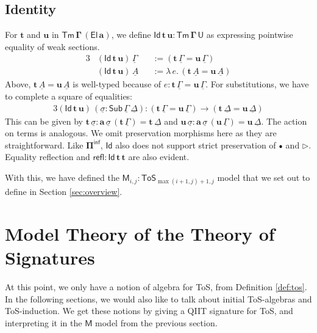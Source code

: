 \documentclass{article}
\theoremstyle{definition}
\theoremstyle{theorem}
\newcommand{\refl}{\mathsf{refl}}
\newcommand{\Sub}{\mathsf{Sub}}
\newcommand{\Tm}{\mathsf{Tm}}
\newcommand{\U}{\mathsf{U}}
\newcommand{\El}{\mathsf{El}}
\newcommand{\Id}{\mathsf{Id}}
\newcommand{\ra}{\rightarrow}
\newcommand{\ToS}{\mathsf{ToS}}
\newcommand{\ext}{\triangleright}
\newcommand{\emptycon}{\scaleobj{.75}\bullet}
\newcommand{\Piinf}{\Pi^{\mathsf{inf}}}
\newcommand{\bTm}{\boldsymbol{\Tm}}
\newcommand{\bGamma}{\boldsymbol{\Gamma}}
\newcommand{\bt}{\boldsymbol{t}}
\newcommand{\bu}{\boldsymbol{u}}
\newcommand{\ba}{\boldsymbol{a}}
\newcommand{\bU}{\boldsymbol{\U}}
\newcommand{\bEl}{\boldsymbol{\El}}
\newcommand{\bPiinf}{\boldsymbol{\Piinf}}
\newcommand{\bId}{\boldsymbol{\Id}}
\newcommand{\bM}{\boldsymbol{\mathsf{M}}}
\newcommand{\ul}[1]{\underline{#1}}
\newcommand{\ulGamma}{\ul{\Gamma}}
\newcommand{\ulDelta}{\ul{\Delta}}
\newcommand{\ulsigma}{\ul{\sigma}}
\newcommand{\ulA}{\ul{A}}
\begin{document}
\subsection{Identity}
For $\bt$ and $\bu$ in $\bTm\,\bGamma\,(\bEl\,\ba)$, we define $\bId\,\bt\,\bu
\boldsymbol{:} \bTm\,\bGamma\,\bU$ as expressing pointwise equality of weak
sections.
\begin{alignat*}{3}
& (\bId\,\bt\,\bu)\,\ulGamma &&:= (\bt\,\ulGamma = \bu\,\ulGamma)\\
& (\bId\,\bt\,\bu)\,\ulA     && := \lambda\,e.\, (\bt\,\ulA = \bu\,\ulA)
\end{alignat*}
Above, $\bt\,\ulA = \bu\,\ulA$ is well-typed because of $e :
\bt\,\ulGamma = \bu\,\ulGamma$. For substitutions, we have to complete a square
of equalities:
\begin{alignat*}{3}
  (\bId\,\bt\,\bu)\,(\ulsigma : \Sub\,\ulGamma\,\ulDelta) : (\bt\,\ulGamma = \bu\,\ulGamma) \ra
       (\bt\,\ulDelta = \bu\,\ulDelta)
\end{alignat*}
This can be given by $\bt\,\ulsigma : \ba\,\ulsigma\,(\bt\,\ulGamma) =
\bt\,\ulDelta$ and $\bu\,\ulsigma : \ba\,\ulsigma\,(\bu\,\ulGamma) =
\bu\,\ulDelta$. The action on terms is analogous. We omit preservation morphisms
here as they are straightforward. Like $\bPiinf$, $\bId$ also does not support
strict preservation of $\emptycon$ and $\ext$. Equality reflection and $\boldsymbol{\refl :}
\bId\,\bt\,\bt$ are also evident.

With this, we have defined the $\bM_{i,j} : \ToS_{\max(i+1,j)+1, j}$ model that
we set out to define in Section \ref{sec:overview}.

\section{Model Theory of the Theory of Signatures}
\label{sec:tossig}

At this point, we only have a notion of algebra for ToS, from Definition
\ref{def:tos}. In the following sections, we would also like to talk about
initial ToS-algebras and ToS-induction. We get these notions by giving a QIIT
signature for ToS, and interpreting it in the $\bM$ model from the previous
section.
\end{document}
